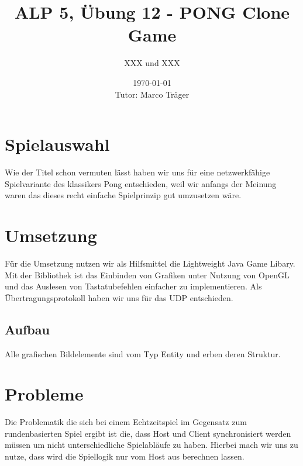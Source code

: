 \documentclass[a4paper,12pt]{article}
\begin{document}
\title{ALP 5, Übung 12 - PONG Clone Game}
\author{XXX und XXX}
\date{\today\\[3pt]
Tutor: Marco Träger}
\maketitle
\tableofcontents

\section{Spielauswahl}
Wie der Titel schon vermuten lässt haben wir uns für eine netzwerkfähige Spielvariante des klassikers Pong entschieden, weil wir anfangs der Meinung waren das dieses recht einfache Spielprinzip gut umzusetzen wäre. 
\section{Umsetzung}
Für die Umsetzung nutzen wir als Hilfsmittel die Lightweight Java Game Libary. Mit der Bibliothek ist das Einbinden von Grafiken unter Nutzung von OpenGL und das Auslesen von Tastatubefehlen einfacher zu implementieren. Als Übertragungsprotokoll haben wir uns für das UDP entschieden.
\subsection{Aufbau}
Alle grafischen Bildelemente sind vom Typ Entity und erben deren Struktur.
\section{Probleme}
Die Problematik die sich bei einem Echtzeitspiel im Gegensatz zum rundenbasierten Spiel ergibt ist die, dass Host und Client synchronisiert werden müssen um nicht unterschiedliche Spielabläufe zu haben. Hierbei mach wir uns zu nutze, dass wird die Spiellogik nur vom Host aus berechnen lassen.
\end{document}
